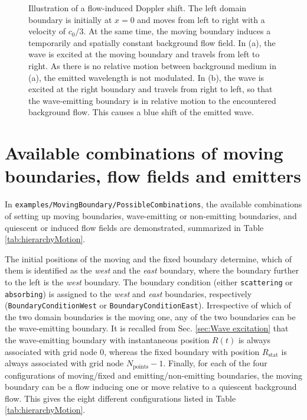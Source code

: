 \begin{figure}
    \centering
    \caption{Illustration of a flow-induced Doppler shift. The left domain boundary is initially at $x=0$ and moves from left to right with a velocity of $c_0/3$. At the same time, the moving boundary induces a temporarily and spatially constant background flow field. In (a), the wave is excited at the moving boundary and travels from left to right. As there is no relative motion between background medium in (a), the emitted wavelength is not modulated. In (b), the wave is excited at the right boundary and travels from right to left, so that the wave-emitting boundary is in relative motion to the encountered background flow. This causes a blue shift of the emitted wave.}
    \label{fig:ConvectedWave}
\end{figure}


\section{Available combinations of moving boundaries, flow fields and emitters}

In {\tt examples/MovingBoundary/PossibleCombinations}, the available combinations of setting up moving boundaries, wave-emitting or non-emitting boundaries, and quiescent or induced flow fields are demonstrated, summarized in Table \ref{tab:hierarchyMotion}.

The initial positions of the moving and the fixed boundary determine, which of them is identified as the \textit{west} and the \textit{east} boundary, where the boundary further to the left is the \textit{west} boundary. The boundary condition (either {\tt scattering} or {\tt absorbing}) is assigned to the \textit{west} and \textit{east} boundaries, respectively ({\tt BoundaryConditionWest} or {\tt BoundaryConditionEast}). Irrespective of which of the two domain boundaries is the moving one, any of the two boundaries can be the wave-emitting boundary. It is recalled from Sec. \ref{sec:Wave excitation} that the wave-emitting boundary with instantaneous position $R\left(t\right)$ is always associated with grid node $0$, whereas the fixed boundary with position $R_{\mathrm{stat}}$ is always associated with grid node $N_{\mathrm{points}}-1$. Finally, for each of the four configurations of moving/fixed and emitting/non-emitting boundaries, the moving boundary can be a flow inducing one or move relative to a quiescent background flow. This gives the eight different configurations listed in Table \ref{tab:hierarchyMotion}.


